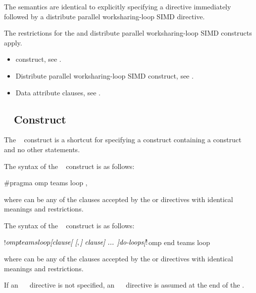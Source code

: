 \descr
The semantics are identical to explicitly specifying a  directive 
immediately followed by a distribute parallel worksharing-loop SIMD directive. 

\restrictions
The restrictions for the  and distribute parallel worksharing-loop
SIMD constructs apply.

\crossreferences
\begin{itemize}
\item {} construct, see
.

\item Distribute parallel worksharing-loop SIMD construct, see
.

\item Data attribute clauses, see
.
\end{itemize}



\subsection{~ Construct}
\label{subsec:teams loop Construct}
\summary
The ~ construct is a shortcut for specifying a  
construct containing a  construct and no other statements.

\syntax
\begin{ccppspecific}
The syntax of the ~ construct is as follows:

\begin{ompcPragma}
#pragma omp teams loop \plc{[clause[ [},\plc{] clause] ... ] new-line}
\end{ompcPragma}

where  can be any of the clauses accepted by the  or
 directives with identical meanings and restrictions.
\end{ccppspecific}

\begin{fortranspecific}
The syntax of the ~ construct is as follows:

\begin{ompfPragma}
!$omp teams loop \plc{[clause[ [},\plc{] clause] ... ]}
    \plc{do-loops}
\plc{[}!$omp end teams loop\plc{]}
\end{ompfPragma}

where  can be any of the clauses accepted by the  or
 directives with identical meanings and restrictions.

If an ~~ directive is not specified, an
~~ directive is assumed at the end of the 
.
\end{fortranspecific}


